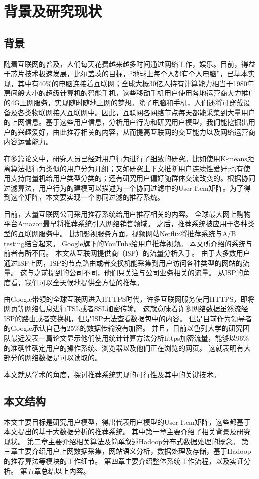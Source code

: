 \chapter{背景及研究现状}

\section{背景}
随着互联网的普及，人们每天花费越来越多时间通过网络工作，娱乐。目前，得益于芯片技术极速发展，比尔盖茨的目标，“地球上每个人都有个人电脑”，已基本实现，其中有40\%的电脑连接着互联网；全球大概30亿人持有计算能力相当于1980年房间般大小的超级计算机的智能手机，这些移动手机用户使用各地运营商大力推广的4G上网服务，实现随时随地上网的梦想。除了电脑和手机，人们还将可穿戴设备及各类物联网接入互联网中。因此，互联网各网络节点每天都能采集到大量用户的上网信息。基于这些用户信息，分析用户行为和研究用户模型，我们能挖掘出用户的兴趣爱好，由此推荐相关的内容，从而提高互联网的交互能力以及网络运营商内容运营能力。

在多篇论文中，研究人员已经对用户行为进行了细致的研究。比如使用K-means距离算法\parencite{杨清龙2013基于网络日志的互联网用户行为分析}把行为类似的用户分为几组；又如研究上下文推断用户连续性爱好\parencite{史艳翠2013基于通信数据的上下文移动用户偏好动态获取方法研究};也有使用支持向量机给用户类型分类的\parencite{程辉2013网络用户偏好分析及话题趋势预测方法研究}；还有研究用户偏好随群体交流改变的\parencite{张欢2014网络用户偏好分析方法的研究,程辉2013网络用户偏好分析及话题趋势预测方法研究}。根据协同过滤算法\parencite{resnick1994grouplens}，用户行为的建模可以描述为一个协同过滤中的User-Item矩阵。为了得到这个矩阵，本文要实现一个协同过滤的推荐系统。

目前，大量互联网公司采用推荐系统给用户推荐相关的内容。
全球最大网上购物平台Amazon最早将推荐系统引入网络销售领域\parencite{Linden2010Amazon}。
之后，推荐系统被应用于各种类型的互联网服务中。
比如影视服务方面，视频网站Netflix将推荐系统与A/B testing结合起来\parencite{Gomez2015The}。
Google旗下的YouTube给用户推荐视频\parencite{Davidson2010The}。
本文所介绍的系统与前者有所不同。
本文从互联网提供商（ISP）的流量分析入手。
由于大多数用户通过ISP上网，ISP的节点路由或者交换机能采集到用户访问各种类型的网站的流量。
这与之前提到的公司不同，他们只关注与公司业务相关的流量。
从ISP的角度看，我们可以全天候地提供全方位的推荐。

由Google带领的全球互联网进入HTTPS时代，许多互联网服务使用HTTPS，即将网页等网络信息进行TSL或者SSL加密传输。
这就意味着许多网络数据虽然流经ISP的路由或者交换机，但是ISP无法查看数据包中的内容。
但是目前作为领导者的Google承认自己有25\%的数据传输没有加密。
并且，日前以色列大学的研究团队最近发表一篇论文显示他们使用统计计算方法分析https加密流量，能够以96\%的准确性确定用户的操作系统、浏览器以及他们正在浏览的网页。
这就表明有大部分的网络数据是可以读取的。

本文就从学术的角度，探讨推荐系统实现的可行性及其中的关键技术。

\section{本文结构}
本文主要目标是研究用户模型，得出代表用户模型的User-Item矩阵，这些都基于本文提出的基于大数据分析的推荐系统。
其中第一章主要介绍了相关背景及研究现状。
第二章主要介绍相关算法及简单叙述Hadoop分布式数据处理的概念。
第三章主要介绍用户上网数据采集，网站语义分析，数据处理及存储，基于Hadoop的推荐算法等模块的工作细节。
第四章主要介绍整体系统工作流程，以及实证分析。
第五章总结以上内容。